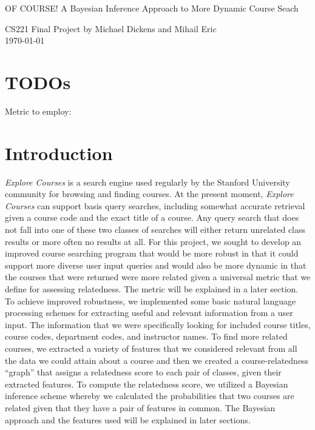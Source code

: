 \documentclass[12pt]{article}
\begin{document}
\begin{center}
{\Large OF COURSE! A Bayesian Inference Approach to More Dynamic Course Seach}
\begin{center}
{\normalsize CS221 Final Project by Michael Dickens and Mihail Eric}\\
\today 
\end{center}

\end{center}



\section*{TODOs}
Metric to employ: 

\section*{Introduction}
	\emph{Explore Courses} is a search engine used regularly by the Stanford University community for browsing and finding courses. At the present moment, \emph{Explore Courses} can support basis query searches, including somewhat accurate retrieval given a course code and the exact title of a course. Any query search that does not fall into one of these two classes of searches will either return unrelated class results or more often no results at all. For this project, we sought to develop an improved course searching program that would be more robust in that it could support more diverse user input queries and would also be more dynamic in that the courses that were returned were more related given a universal metric that we define for assessing relatedness. The metric will be explained in a later section. \\
	To achieve improved robustness, we implemented some basic natural language processing schemes for extracting useful and relevant information from a user input. The information that we were specifically looking for included course titles, course codes, department codes, and instructor names. To find more related courses, we extracted a variety of features that we considered relevant from all the data we could attain about a course and then we created a course-relatedness ``graph'' that assigns a relatedness score to each pair of classes, given their extracted features. To compute the relatedness score, we utilized a Bayesian inference scheme whereby we calculated the probabilities that two courses are related given that they have a pair of features in common. The Bayesian approach and the features used will be explained in later sections.
\end{document}

